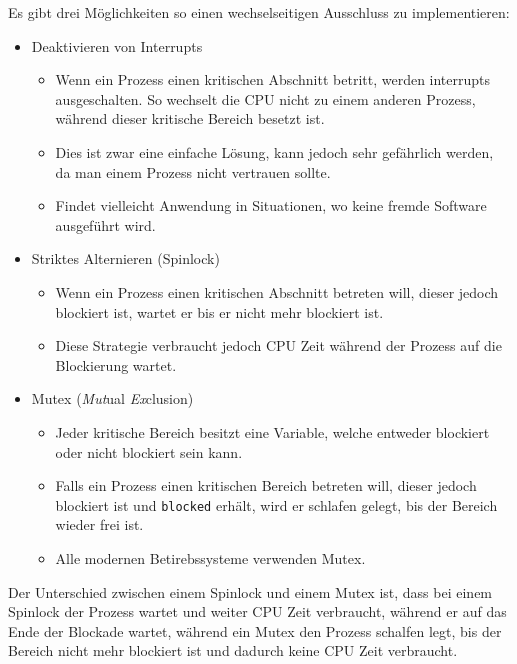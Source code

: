 \documentclass{article}
\begin{document}
	 Es gibt drei Möglichkeiten so einen wechselseitigen Ausschluss zu implementieren:
	 \begin{itemize}
	 	\item{Deaktivieren von Interrupts}
	 	\begin{itemize}
	 		\item{Wenn ein Prozess einen kritischen Abschnitt betritt, werden interrupts ausgeschalten. So wechselt die CPU nicht zu einem anderen Prozess, während dieser kritische Bereich besetzt ist.}
	 		\item{Dies ist zwar eine einfache Lösung, kann jedoch sehr gefährlich werden, da man einem Prozess nicht vertrauen sollte.}
	 		\item{Findet vielleicht Anwendung in Situationen, wo keine fremde Software ausgeführt wird.}
	 	\end{itemize}
	 	\item{Striktes Alternieren (Spinlock)}
	 	\begin{itemize}
	 		\item{Wenn ein Prozess einen kritischen Abschnitt betreten will, dieser jedoch blockiert ist, wartet er bis er nicht mehr blockiert ist.}
	 		\item{Diese Strategie verbraucht jedoch CPU Zeit während der Prozess auf die Blockierung wartet.}
	 	\end{itemize}
	 	\item{Mutex (\textit{Mut}ual \textit{Ex}clusion)}
	 	\begin{itemize}
	 		\item{Jeder kritische Bereich besitzt eine Variable, welche entweder blockiert oder nicht blockiert sein kann.}
	 		\item{Falls ein Prozess einen kritischen Bereich betreten will, dieser jedoch blockiert ist und \verb|blocked| erhält, wird er schlafen gelegt, bis der Bereich wieder frei ist.}
	 		\item{Alle modernen Betirebssysteme verwenden Mutex.}
	 	\end{itemize}
	 \end{itemize}
	 Der Unterschied zwischen einem Spinlock und einem Mutex ist, dass bei einem Spinlock der Prozess wartet und weiter CPU Zeit verbraucht, während er auf das Ende der Blockade wartet, während ein Mutex den Prozess schalfen legt, bis der Bereich nicht mehr blockiert ist und dadurch keine CPU Zeit verbraucht.
\end{document}
